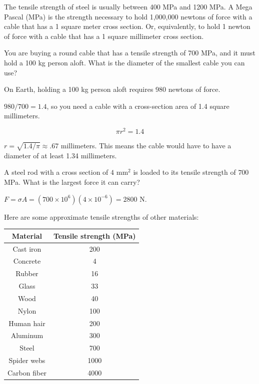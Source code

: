 \begin{Exercise}[title={Tensile Strength}, label=tensile-mpa]

The tensile strength of steel is usually between 400 MPa and 1200
MPa. A Mega Pascal (MPa) is the strength necessary to hold 1,000,000 newtons of
force with a cable that has a 1 square meter cross section. Or,
equivalently, to hold 1 newton of force with a cable that has a 1
square millimeter cross section. 

You are buying a round cable that has a tensile strength of
700 MPa, and it must hold a 100 kg person aloft. What is the diameter of the
smallest cable you can use?
  
\end{Exercise}
\begin{Answer}[ref=tensile-mpa]
On Earth, holding a 100 kg person aloft requires 980 newtons of force.

$980/700 = 1.4$, so you need a cable with a cross-section area of 1.4
square millimeters.

$$\pi r^2 = 1.4$$

$r = \sqrt{1.4/\pi} \approx .67$ millimeters. This means the cable would
have to have a diameter of at least 1.34 millimeters.

\end{Answer}

\begin{Exercise}[title={Holding Capacity}, label=materials_capacity]
A steel rod with a cross section of $4$ mm$^2$ is loaded to its tensile strength of $700$ MPa. What is the largest force it can carry?
\end{Exercise}
\begin{Answer}[ref=materials_capacity]
$F = \sigma A = (700 \times 10^6)(4 \times 10^{-6}) = 2800$ N.
\end{Answer}

Here are some approximate tensile strengths of other materials:

\begin{tabular}{c|c}
  Material & Tensile strength (MPa) \\
  \hline
  Cast iron & 200 \\
  Concrete & 4 \\
  Rubber & 16 \\
  Glass & 33 \\
  Wood & 40 \\
  Nylon & 100 \\
  Human hair & 200 \\
  Aluminum  & 300 \\
  Steel & 700 \\
  Spider webs & 1000 \\
  Carbon fiber & 4000
\end{tabular}

